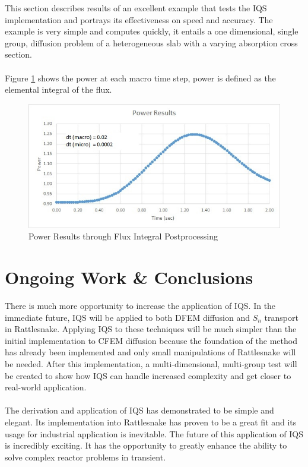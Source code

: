 \documentclass[11pt]{scrartcl}
\begin{document}
This section describes results of an excellent example that tests the IQS implementation and portrays its effectiveness on speed and accuracy.  The example is very simple and computes quickly, it entails a one dimensional, single group, diffusion problem of a heterogeneous slab with a varying absorption cross section.
\\ \\
Figure \ref{fig:power} shows the power at each macro time step, power is defined as the elemental integral of the flux.
\begin{figure}[h]
\includegraphics[width=\linewidth]{power_results.jpg}
\caption{Power Results through Flux Integral Postprocessing}
\label{fig:power}
\end{figure}

\section{Ongoing Work \& Conclusions}

There is much more opportunity to increase the application of IQS.  In the immediate future, IQS will be applied to both DFEM diffusion and $S_n$ transport in Rattlesnake.  Applying IQS to these techniques will be much simpler than the initial implementation to CFEM diffusion because the foundation of the method has already been implemented and only small manipulations of Rattlesnake will be needed.  After this implementation, a multi-dimensional, multi-group test will be created to show how IQS can handle increased complexity and get closer to real-world application.
\\ \\
The derivation and application of IQS has demonstrated to be simple and elegant.  Its implementation into Rattlesnake has proven to be a great fit and its usage for industrial application is inevitable.  The future of this application of IQS is incredibly exciting.  It has the opportunity to greatly enhance the ability to solve complex reactor problems in transient.
\end{document}
